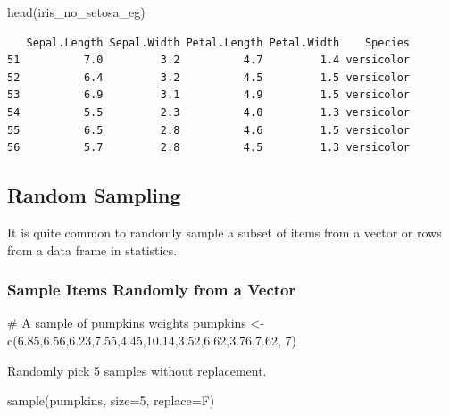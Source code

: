 \documentclass[
  letterpaper,
  DIV=11,
  numbers=noendperiod]{scrreprt}
\newenvironment{Shaded}{\begin{snugshade}}{\end{snugshade}}
\newcommand{\AttributeTok}[1]{\textcolor[rgb]{0.40,0.45,0.13}{#1}}
\newcommand{\CommentTok}[1]{\textcolor[rgb]{0.37,0.37,0.37}{#1}}
\newcommand{\DecValTok}[1]{\textcolor[rgb]{0.68,0.00,0.00}{#1}}
\newcommand{\FloatTok}[1]{\textcolor[rgb]{0.68,0.00,0.00}{#1}}
\newcommand{\FunctionTok}[1]{\textcolor[rgb]{0.28,0.35,0.67}{#1}}
\newcommand{\NormalTok}[1]{\textcolor[rgb]{0.00,0.23,0.31}{#1}}
\newcommand{\OtherTok}[1]{\textcolor[rgb]{0.00,0.23,0.31}{#1}}
\begin{document}
\begin{Shaded}
\begin{Highlighting}[]
\FunctionTok{head}\NormalTok{(iris\_no\_setosa\_eg)}
\end{Highlighting}
\end{Shaded}

\begin{verbatim}
   Sepal.Length Sepal.Width Petal.Length Petal.Width    Species
51          7.0         3.2          4.7         1.4 versicolor
52          6.4         3.2          4.5         1.5 versicolor
53          6.9         3.1          4.9         1.5 versicolor
54          5.5         2.3          4.0         1.3 versicolor
55          6.5         2.8          4.6         1.5 versicolor
56          5.7         2.8          4.5         1.3 versicolor
\end{verbatim}

\subsection{Random Sampling}\label{random-sampling}

It is quite common to randomly sample a subset of items from a vector or
rows from a data frame in statistics.

\subsubsection{Sample Items Randomly from a
Vector}\label{sample-items-randomly-from-a-vector}

\begin{Shaded}
\begin{Highlighting}[]
\CommentTok{\# A sample of pumpkins\textquotesingle{} weights}
\NormalTok{pumpkins }\OtherTok{\textless{}{-}} \FunctionTok{c}\NormalTok{(}\FloatTok{6.85}\NormalTok{,}\FloatTok{6.56}\NormalTok{,}\FloatTok{6.23}\NormalTok{,}\FloatTok{7.55}\NormalTok{,}\FloatTok{4.45}\NormalTok{,}\FloatTok{10.14}\NormalTok{,}\FloatTok{3.52}\NormalTok{,}\FloatTok{6.62}\NormalTok{,}\FloatTok{3.76}\NormalTok{,}\FloatTok{7.62}\NormalTok{, }\DecValTok{7}\NormalTok{)}
\end{Highlighting}
\end{Shaded}

Randomly pick 5 samples without replacement.

\begin{Shaded}
\begin{Highlighting}[]
\FunctionTok{sample}\NormalTok{(pumpkins, }\AttributeTok{size=}\DecValTok{5}\NormalTok{, }\AttributeTok{replace=}\NormalTok{F)}
\end{Highlighting}
\end{Shaded}
\end{document}
